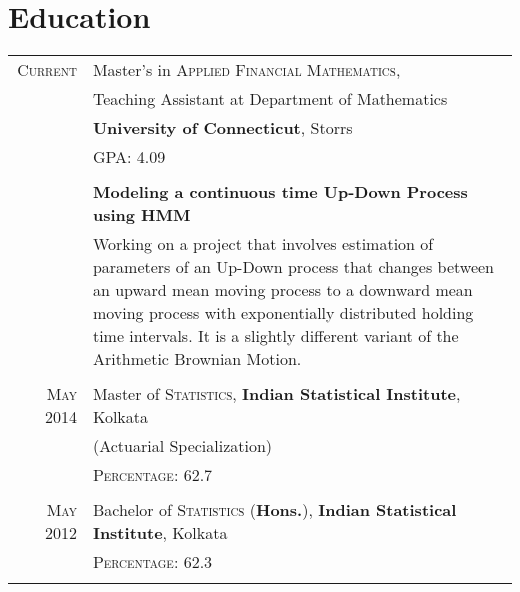 \documentclass[a4paper,10pt]{article}
\begin{document}
\section{Education}
\begin{tabular}{r|p{11cm}}

\textsc{Current}  & Master's in \textsc{Applied Financial Mathematics},\\ & Teaching Assistant at Department of Mathematics \\ & \textbf{University of Connecticut}, Storrs\\
&\normalsize \textsc{GPA}: 4.09 \\ \\
& \textbf{Modeling a continuous time Up-Down Process using HMM} \\ &\footnotesize{Working on a project that involves estimation of parameters of an Up-Down process that changes between an upward mean moving process to a downward mean moving process with exponentially distributed holding time intervals. It is a slightly different variant of the Arithmetic Brownian Motion.  }\\\multicolumn{2}{c}{} \\

 \textsc{May} 2014 & Master of \textsc{Statistics}, \textbf{Indian Statistical Institute}, Kolkata\\
 & (Actuarial Specialization) \\
&\normalsize \textsc{Percentage}: 62.7\\&\\

\textsc{May} 2012 & Bachelor of \textsc{Statistics} (\textbf{Hons.}), \textbf{Indian Statistical Institute}, Kolkata\\ 
&\normalsize \textsc{Percentage}: 62.3\\&\\

\end{tabular}


\end{document}
